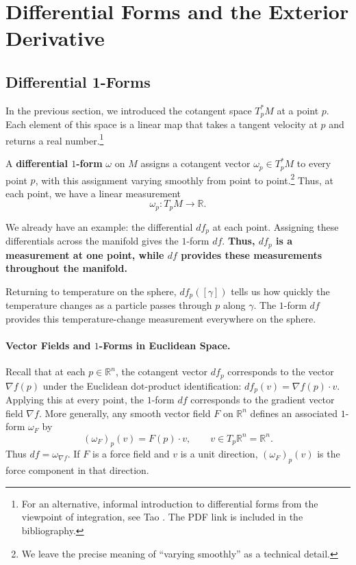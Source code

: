 \section{Differential Forms and the Exterior Derivative}
    \label{sec:forms-derivative}

    \subsection{Differential 1-Forms}
    In the previous section, we introduced the cotangent space $T_p^*M$ at a
    point $p$. Each element of this space is a linear map that takes a tangent
    velocity at $p$ and returns a real number.\footnote{%
        For an alternative, informal introduction to differential forms from
        the viewpoint of integration, see Tao \cite{tao2007differential}.
        The PDF link is included in the bibliography.}

    A \textbf{differential $1$-form} $\omega$ on $M$ assigns a cotangent
    vector $\omega_p \in T_p^*M$ to every point $p$, with this assignment
    varying smoothly from point to point.\footnote{%
        We leave the precise meaning of ``varying smoothly'' as a technical
        detail.} Thus, at each point, we have a
    linear measurement
    \begin{equation}
        \omega_p \colon T_pM \to \mathbb{R}.
    \end{equation}

    We already have an example: the differential $df_p$ at each point.
    Assigning these differentials across the manifold gives the $1$-form $df$.
    \textbf{Thus, $df_p$ is a measurement at one point, while $df$ provides
    these measurements throughout the manifold.}

    Returning to temperature on the sphere, $df_p([\gamma])$ tells us how
    quickly the temperature changes as a particle passes through $p$ along
    $\gamma$. The $1$-form $df$ provides this temperature-change measurement
    everywhere on the sphere.

    \paragraph{Vector Fields and $1$-Forms in Euclidean Space.}
    Recall that at each $p \in \mathbb{R}^n$, the cotangent vector $df_p$ corresponds
    to the vector $\nabla f(p)$ under the Euclidean dot-product identification:
    $df_p(v) = \nabla f(p) \cdot v$. Applying this at every point, the
    $1$-form $df$ corresponds to the gradient vector field $\nabla f$.
    More generally, any smooth vector field $F$ on $\mathbb{R}^n$ defines an
    associated $1$-form $\omega_F$ by
    \begin{equation}
        (\omega_F)_p(v) = F(p) \cdot v, \qquad v \in T_p\mathbb{R}^n = \mathbb{R}^n.
    \end{equation}
    Thus $df = \omega_{\nabla f}$. If $F$ is a force field and $v$ is a unit
    direction, $(\omega_F)_p(v)$ is the force component in that direction.

